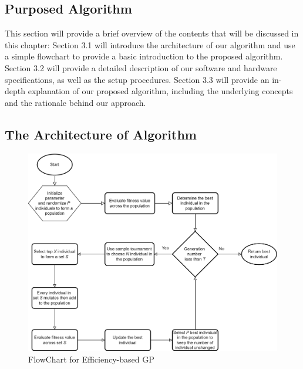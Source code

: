 \begin{ZhChapter}

    \chapter{Purposed Algorithm}
    This section will provide a brief overview of the contents that will be discussed in this chapter: Section 3.1 will introduce the architecture of our algorithm and use a simple flowchart to provide a basic introduction to the proposed algorithm. Section 3.2 will provide a detailed description of our software and hardware specifications, as well as the setup procedures. Section 3.3 will provide an in-depth explanation of our proposed algorithm, including the underlying concepts and the rationale behind our approach.
    \section{The Architecture of Algorithm} %
    \begin{figure}[htbp]
        \centering
        \includegraphics[width = 1\textwidth]{image/FlowChart.png}
        \caption{FlowChart for Efficiency-based GP}
        \label{fig: image}
    \end{figure}



\end{ZhChapter}
